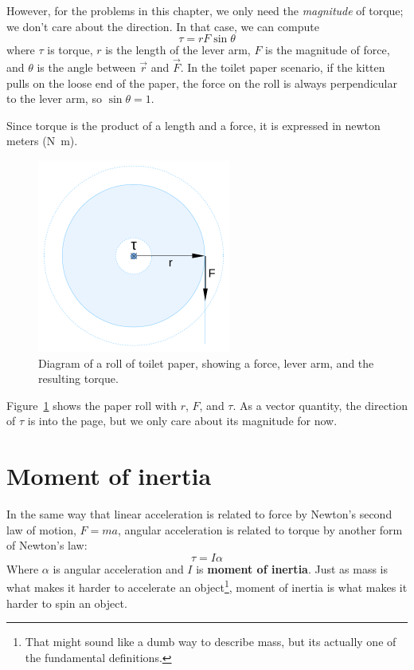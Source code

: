 \documentclass[12pt]{book}
\theoremstyle{exercise}
\begin{document}
However, for the problems in this chapter, we only need the {\em magnitude} of torque; we don't care about the direction.  In that case, we can compute
%
\[ \tau = r F \sin \theta \]
%
where $\tau$ is torque, $r$ is the length of the lever arm, $F$ is the magnitude of force, and $\theta$ is the angle between $\vec{r}$ and $\vec{F}$.  In the toilet paper scenario, if the kitten pulls on the loose end of the paper, the force on the roll is always perpendicular to the lever arm, so $\sin \theta = 1$.

Since torque is the product of a length and a force, it is expressed in newton meters (\si{\newton\meter}).

\begin{figure}
\centerline{\includegraphics[height=2.5in]{figs/paper_roll2.pdf}}
\caption{Diagram of a roll of toilet paper, showing a force, lever arm, and the resulting torque.}
\label{paper_roll2}
\end{figure}

Figure~\ref{paper_roll2} shows the paper roll with $r$, $F$, and $\tau$.  As a vector quantity, the direction of $\tau$ is into the page, but we only care about its magnitude for now.


\section{Moment of inertia}

In the same way that linear acceleration is related to force by Newton's second law of motion, $F=ma$, angular acceleration is related to torque by another form of Newton's law:
%
\[ \tau = I \alpha \]
%
Where $\alpha$ is angular acceleration and $I$ is {\bf moment of inertia}.  Just as mass is what makes it harder to accelerate an object\footnote{That might sound like a dumb way to describe mass, but its actually one of the fundamental definitions.}, moment of inertia is what makes it harder to spin an object.
\end{document}
